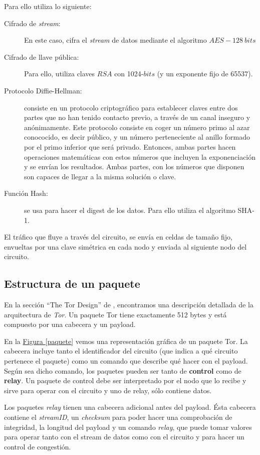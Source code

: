 \documentclass[10pt,a4paper,spanish]{article}
\begin{document}
Para ello utiliza lo siguiente:

\begin{description}
    \item [Cifrado de \textit{stream}:] En este caso, cifra el \textit{stream} de datos mediante el algoritmo $AES-128~bits$
    \item [Cifrado de llave pública:] Para ello, utiliza claves $RSA$ con 1024-$bits$ (y un exponente fijo de 65537).
    \item [Protocolo Diffie-Hellman:] consiste en un protocolo criptográfico para establecer claves entre dos partes que no han tenido contacto previo, a través de un canal inseguro y anónimamente. Este protocolo consiste en coger un número primo al azar conococido, es decir público, y un número perteneciente al anillo formado por el primo inferior que será privado. Entonces, ambas partes hacen operaciones matemáticas con estos números que incluyen la exponenciación y se envían los resultados. Ambas partes, con los números que disponen son capaces de llegar a la misma solución o clave.
    \item [Función Hash:] se usa para hacer el digest de los datos. Para ello utiliza el algoritmo SHA-1.
\end{description}

El tráfico que fluye a través del circuito, se envía en celdas de tamaño fijo, envueltas por una clave simétrica en cada nodo y enviada al siguiente nodo del circuito. 

\subsection{Estructura de un paquete}
En la sección ``The Tor Design'' de \cite{design}, encontramos una descripción detallada de la arquitectura de \textit{Tor}. Un paquete Tor tiene exactamente 512 bytes y está compuesto por una cabecera y un payload. 

En la \hyperref[paquete]{Figura \ref*{paquete}} vemos una representación gráfica de un paquete Tor. La cabecera incluye tanto el identificador del circuito (que indica a qué circuito pertenece el paquete) como un comando que describe qué hacer con el payload. Según sea dicho comando, los paquetes pueden ser tanto de \textbf{control} como de \textbf{relay}. Un paquete de control debe ser interpretado por el nodo que lo recibe y sirve para operar con el circuito y uno de relay, sólo contiene datos.

Los paquetes \textit{relay} tienen una cabecera adicional antes del payload. Ésta cabecera contiene el \textit{streamID}, un \textit{checksum} para poder hacer una comprobación de integridad, la longitud del payload y un comando \textit{relay}, que puede tomar valores para operar tanto con el stream de datos como con el circuito y para hacer un control de congestión.
\end{document}
